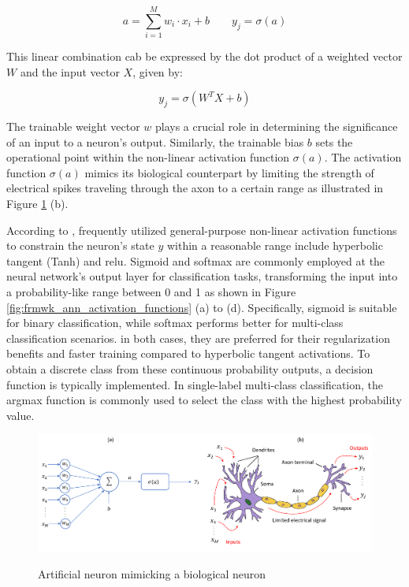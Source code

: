 \begin{equation}
    \label{eq:ann_activation}
    a = \sum_{i=1}^M w_i \cdot x_i + b \quad\quad y_j = \sigma(a)
\end{equation}

This linear combination cab be expressed by the dot product of a weighted vector $W$ and the input vector $X$, given by:

\begin{equation}
    \label{eq:ann_activation_outpu}
    y_j = \sigma  \left( W^TX +b \right)
\end{equation}

The trainable weight vector $w$ plays a crucial role in determining the significance of an input to a neuron's output. Similarly, the trainable bias $b$ sets the operational point within the non-linear activation function $\sigma(a)$. The activation function $\sigma(a)$ mimics its biological counterpart by limiting the strength of electrical spikes traveling through the axon to a certain range as illustrated in Figure \ref{fig:frmwk_ann_artificial_neuron} (b).

According to \textcite{Bishop2023}, frequently utilized general-purpose non-linear activation functions to constrain the neuron's state $y$ within a reasonable range include hyperbolic tangent (Tanh) and \gls{relu}. Sigmoid and softmax are commonly employed at the neural network's output layer for classification tasks, transforming the input into a probability-like range between 0 and 1 as shown in Figure \ref{fig:frmwk_ann_activation_functions} (a) to (d). Specifically, sigmoid is suitable for binary classification, while softmax performs better for multi-class classification scenarios. in both cases, they are preferred for their regularization benefits and faster training compared to hyperbolic tangent activations. To obtain a discrete class from these continuous probability outputs, a decision function is typically implemented. In single-label multi-class classification, the argmax function is commonly used to select the class with the highest probability value. 

\begin{figure}[htbp]
    \raggedright
        \caption{Artificial neuron mimicking a biological neuron}
        \includegraphics[width=1\textwidth]{resources/images/030-theoretical_framework/Framework_ann_neuron.png}
        \label{fig:frmwk_ann_artificial_neuron}
\end{figure}

